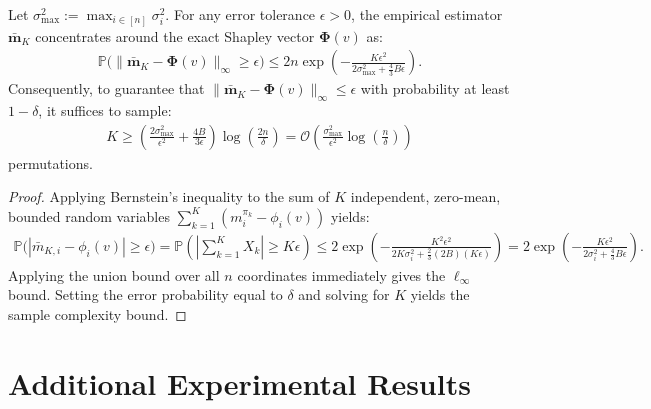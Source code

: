 \begin{theorem}\label{thm:bernstein_shapley}
Let $\sigma_{\max}^2 := \max_{i \in [n]} \sigma_i^2$. For any error tolerance $\epsilon > 0$, the empirical estimator $\bar{\mathbf{m}}_K$ concentrates around the exact Shapley vector $\boldsymbol{\Phi}(v)$ as:
\begin{align}
    \mathbb{P}\Big( \|\bar{\mathbf{m}}_K - \boldsymbol{\Phi}(v)\|_\infty \ge \epsilon \Big) \le 2n \exp\left( -\frac{K \epsilon^2}{2 \sigma_{\max}^2 + \frac{4}{3} B \epsilon} \right).
\end{align}
Consequently, to guarantee that $\|\bar{\mathbf{m}}_K - \boldsymbol{\Phi}(v)\|_\infty \le \epsilon$ with probability at least $1 - \delta$, it suffices to sample:
\begin{align}
    K \ge \left( \frac{2 \sigma_{\max}^2}{\epsilon^2} + \frac{4 B}{3 \epsilon} \right) \log\left( \frac{2n}{\delta} \right) = \mathcal{O}\left( \frac{\sigma_{\max}^2}{\epsilon^2} \log\left(\frac{n}{\delta}\right) \right)
\end{align}
permutations.
\end{theorem}

\begin{proof}
Applying Bernstein's inequality to the sum of $K$ independent, zero-mean, bounded random variables $\sum_{k=1}^K (m_i^{\pi_k} - \phi_i(v))$ yields:
\begin{align}
    \mathbb{P}\Big( |\bar{m}_{K, i} - \phi_i(v)| \ge \epsilon \Big) = \mathbb{P}\left( \left|\sum_{k=1}^K X_k\right| \ge K \epsilon \right) \le 2 \exp\left( -\frac{K^2 \epsilon^2}{2 K \sigma_i^2 + \frac{2}{3}(2B)(K \epsilon)} \right) = 2 \exp\left( -\frac{K \epsilon^2}{2 \sigma_i^2 + \frac{4}{3} B \epsilon} \right).
\end{align}
Applying the union bound over all $n$ coordinates immediately gives the $\ell_\infty$ bound. Setting the error probability equal to $\delta$ and solving for $K$ yields the sample complexity bound.
\end{proof}



\section{Additional Experimental Results}
\label{app:exp_correct}

